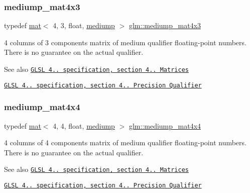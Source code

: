 \subsubsection{\texorpdfstring{mediump\+\_\+mat4x3}{mediump\_mat4x3}}
{\footnotesize\ttfamily typedef \mbox{\hyperlink{structglm_1_1mat}{mat}}$<$ 4, 3, float, \mbox{\hyperlink{namespaceglm_a36ed105b07c7746804d7fdc7cc90ff25a6416f3ea0c9025fb21ed50c4d6620482}{mediump}} $>$ \mbox{\hyperlink{group__core__precision_ga2d5eb7a43e7564b4e048512b8488994a}{glm\+::mediump\+\_\+mat4x3}}}

4 columns of 3 components matrix of medium qualifier floating-\/point numbers. There is no guarantee on the actual qualifier.

\begin{DoxySeeAlso}{See also}
\href{http://www.opengl.org/registry/doc/GLSLangSpec.4.20.8.pdf}{\tt G\+L\+SL 4.. specification, section 4.. Matrices} 

\href{http://www.opengl.org/registry/doc/GLSLangSpec.4.20.8.pdf}{\tt G\+L\+SL 4.. specification, section 4.. Precision Qualifier} 
\end{DoxySeeAlso}
\mbox{\label{group__core__precision_ga80dd7aaae2879e86a588c36a39652ee4}} 
\subsubsection{\texorpdfstring{mediump\+\_\+mat4x4}{mediump\_mat4x4}}
{\footnotesize\ttfamily typedef \mbox{\hyperlink{structglm_1_1mat}{mat}}$<$ 4, 4, float, \mbox{\hyperlink{namespaceglm_a36ed105b07c7746804d7fdc7cc90ff25a6416f3ea0c9025fb21ed50c4d6620482}{mediump}} $>$ \mbox{\hyperlink{group__core__precision_ga80dd7aaae2879e86a588c36a39652ee4}{glm\+::mediump\+\_\+mat4x4}}}

4 columns of 4 components matrix of medium qualifier floating-\/point numbers. There is no guarantee on the actual qualifier.

\begin{DoxySeeAlso}{See also}
\href{http://www.opengl.org/registry/doc/GLSLangSpec.4.20.8.pdf}{\tt G\+L\+SL 4.. specification, section 4.. Matrices} 

\href{http://www.opengl.org/registry/doc/GLSLangSpec.4.20.8.pdf}{\tt G\+L\+SL 4.. specification, section 4.. Precision Qualifier} 
\end{DoxySeeAlso}
\mbox{\label{group__core__precision_ga08ae38ad78ade3539fdd1d25052b8c51}} 
